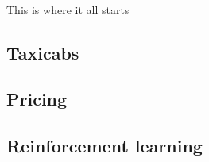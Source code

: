\paragraph{}
This is where it all starts \cite{Yang2000taxi+utilization}

\subsection{Taxicabs}

\subsection{Pricing}

\subsection{Reinforcement learning}
